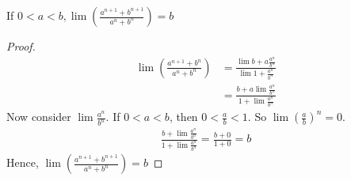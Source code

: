 \documentclass[12pt]{article}
\newenvironment{claim}[2][Claim]{\begin{trivlist}
		\item[\hskip \labelsep {\bfseries #1}\hskip \labelsep {\bfseries #2}]}{\end{trivlist}}
\begin{document}
\begin{claim}{3.2.12}
	If $ 0 < a < b,  \lim \left ( \frac{a^{n + 1} + b^{n + 1}}{a^n + b^n} \right ) = b$
\end{claim}
\begin{proof}
	\begin{align*}
		\lim \left ( \frac{a^{n + 1} + b^{n}}{a^n + b^n} \right ) & = \frac{\lim b + a \frac{a^n}{b^n}} {\lim 1 + \frac{a^n}{b^n}}\\
		& = \frac{b + a\lim \frac{a^n}{b^n}}{ 1 + \lim \frac{a^n}{b^n}}
	\end{align*}
	Now consider $\lim \frac{a^n}{b^n}$. If $0 < a < b $, then $0 < \frac{a}{b} < 1$. So $\lim 
	\left ( \frac{a}{b} \right )^n = 0$.
	\begin{align*}
		\frac{b + \lim \frac{a^n}{b^n}}{ 1 + \lim \frac{a^n}{b^n}} = \frac{b + 0}{1 + 0} = b
	\end{align*}
	Hence, $\lim \left ( \frac{a^{n + 1} + b^{n + 1}}{a^n + b^n} \right ) = b$
\end{proof}
\end{document}
